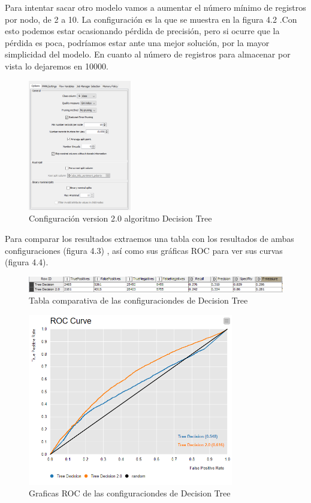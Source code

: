 	Para intentar sacar otro modelo vamos a aumentar el número mínimo de registros por nodo, de 2 a  10. La configuración es la que se muestra en la figura 4.2 .Con esto podemos estar ocasionando pérdida de precisión, pero si ocurre que la pérdida es poca, podríamos estar ante una mejor solución, por la mayor simplicidad del modelo. En cuanto al número de registros para almacenar por vista lo dejaremos en 10000.
	
	\begin{figure}[htb]
		\centering
		\includegraphics[width=0.4\textwidth]{./imagenes/41}
		\caption{Configuración version 2.0 algoritmo Decision Tree} \label{fig:1}
	\end{figure}
	
	Para comparar los resultados extraemos una tabla con los resultados de ambas configuraciones (figura 4.3) , así como sus gráficas ROC para ver sus curvas (figura 4.4). \\
	
	\begin{figure}[htb]
		\centering
		\includegraphics[width=1.0\textwidth]{./imagenes/42}
		\caption{Tabla comparativa de las configuraciondes de Decision Tree} \label{fig:1}
	\end{figure}
	
	\begin{figure}[htb]
		\centering
		\includegraphics[width=0.8\textwidth]{./imagenes/43}
		\caption{Graficas ROC de las configuraciondes de Decision Tree} \label{fig:1}
	\end{figure}
	
